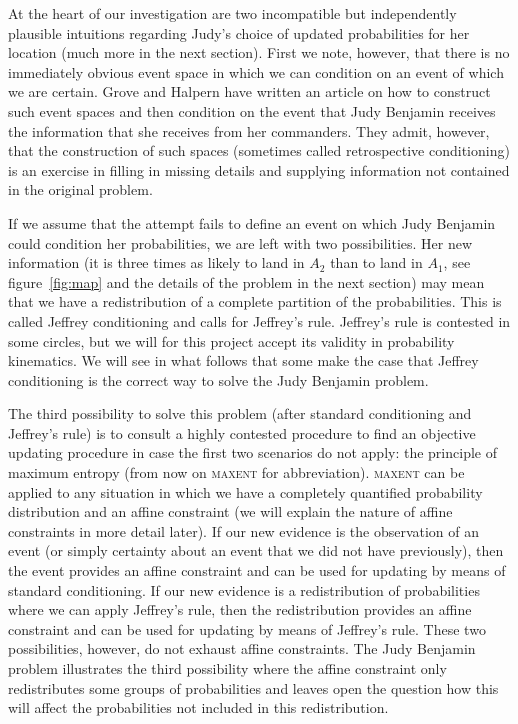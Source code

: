 \documentclass[12pt]{article}
\begin{document}
At the heart of our investigation are two incompatible but
independently plausible intuitions regarding Judy's choice of updated
probabilities for her location (much more in the next section). First
we note, however, that there is no immediately obvious event space in
which we can condition on an event of which we are certain. Grove and
Halpern  have written an article on how to
construct such event spaces and then condition on the event that Judy
Benjamin receives the information that she receives from her
commanders. They admit, however, that the construction of such spaces
(sometimes called retrospective conditioning) is an exercise in
filling in missing details and supplying information not contained in
the original problem.

If we assume that the attempt fails to define an event on which Judy
Benjamin could condition her probabilities, we are left with two
possibilities. Her new information (it is three times as likely to
land in $A_{2}$ than to land in $A_{1}$, see figure~\ref{fig:map} and
the details of the problem in the next section) may mean that we have
a redistribution of a complete partition of the probabilities. This is
called Jeffrey conditioning and calls for Jeffrey's rule. Jeffrey's
rule is contested in some circles, but we will for this project accept
its validity in probability kinematics. We will see in what follows
that some make the case that Jeffrey conditioning is the correct way
to solve the Judy Benjamin problem.

The third possibility to solve this problem (after standard
conditioning and Jeffrey's rule) is to consult a highly contested
procedure to find an objective updating procedure in case the first
two scenarios do not apply: the principle of maximum entropy (from now
on \textsc{maxent} for abbreviation). \textsc{maxent} can be applied
to any situation in which we have a completely quantified probability
distribution and an affine constraint (we will explain the nature of
affine constraints in more detail later). If our new evidence is the
observation of an event (or simply certainty about an event that we
did not have previously), then the event provides an affine constraint
and can be used for updating by means of standard conditioning. If our
new evidence is a redistribution of probabilities where we can apply
Jeffrey's rule, then the redistribution provides an affine constraint
and can be used for updating by means of Jeffrey's rule. These two
possibilities, however, do not exhaust affine constraints. The Judy
Benjamin problem illustrates the third possibility where the affine
constraint only redistributes some groups of probabilities and leaves
open the question how this will affect the probabilities not included
in this redistribution.
\end{document}
